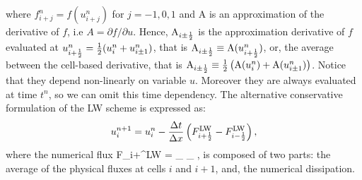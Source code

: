 where $f_{i+j}^n = f(u_{i+j}^n)$ for $j = -1,0,1$ and $\text{A}$ is an approximation of the derivative of $f$, i.e $A= \partial f/\partial u$. 
Hence, $\text{A}_{i\pm\frac{1}{2}}$ is the approximation derivative of $f$
evaluated at $u_{i+\frac{1}{2}}^n=\frac{1}{2}(u_{i}^n + u_{i\pm1}^n)$, that is $\text{A}_{i\pm\frac{1}{2}}\equiv\text{A}(u_{i+\frac{1}{2}}^n)$, or, the average between the cell-based derivative, that is $\text{A}_{i\pm\frac{1}{2}}\equiv \frac{1}{2} \left( \text{A}(u_i^n)+\text{A}(u_{i\pm1}^n) \right)$. 
Notice that they  depend non-linearly on variable $u$. Moreover they are always evaluated at time $t^n$, so we can omit this time dependency.
The alternative conservative formulation of the LW scheme is expressed as:
\begin{equation}
    \label{non-lin_lw_conservative}
    u_i^{n+1}=u_i^n - \frac{\Delta t}{\Delta x}\left(F_{i+\frac{1}{2}}^{\rm{LW}}- F_{i-\frac{1}{2}}^{\rm{LW}}\right),
\end{equation}
where the numerical flux
\bea \label{eq:flux_NL} 
    F_{i+\ha}^{\rm{LW}} = _{} _{} ,
\eea
is composed of two parts: the average of the physical fluxes at cells $i$ and $i+1$, and, the numerical dissipation.





